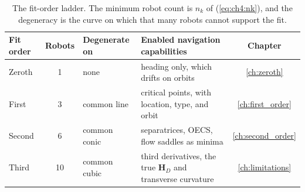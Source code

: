 \begin{table}[htbp]
\centering
\caption{The fit-order ladder. The minimum robot count is $n_k$ of
(\ref{eq:ch4:nk}), and the degeneracy is the curve on which that many
robots cannot support the fit.}
\label{tab:ch4:ladder}
\begin{tabular}{>{\raggedright\arraybackslash}p{1.6cm} c >{\raggedright\arraybackslash}p{2.4cm} >{\raggedright\arraybackslash}p{5.2cm} c}
\hline
Fit order & Robots & Degenerate on & Enabled navigation capabilities & Chapter \\
\hline
Zeroth & 1 & none & heading only, which drifts on orbits & \ref{ch:zeroth} \\
First & 3 & common line & critical points, with location, type, and orbit & \ref{ch:first_order} \\
Second & 6 & common conic & separatrices, OECS, flow saddles as minima & \ref{ch:second_order} \\
Third & 10 & common cubic & third derivatives, the true $\mathbf{H}_D$ and transverse curvature & \ref{ch:limitations} \\
\hline
\end{tabular}
\end{table}
